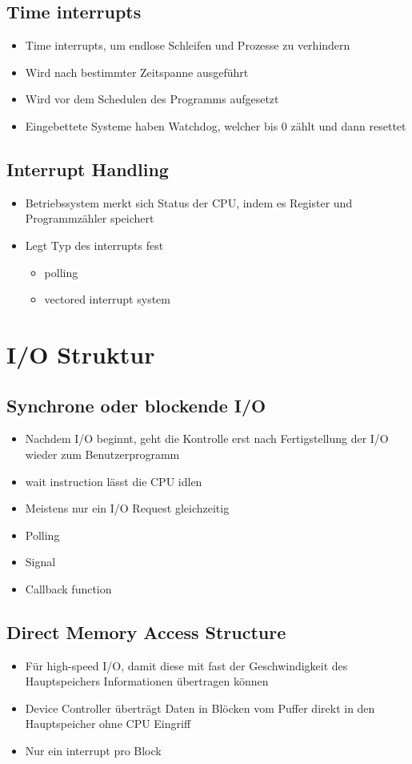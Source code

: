 \documentclass[a4paper]{scrreprt}
\begin{document}
\subsection{Time interrupts}
\begin{itemize}
	\item Time interrupts, um endlose Schleifen und Prozesse zu verhindern
	\item Wird nach bestimmter Zeitspanne ausgeführt
	\item Wird vor dem Schedulen des Programms aufgesetzt
	\item Eingebettete Systeme haben Watchdog, welcher bis 0 zählt und dann resettet
\end{itemize}

\subsection{Interrupt Handling}
\begin{itemize}
	\item Betriebssystem merkt sich Status der CPU, indem es Register und Programmzähler speichert
	\item Legt Typ des interrupts fest
		\begin{itemize}
			\item polling
			\item vectored interrupt system
		\end{itemize}
\end{itemize}

\section{I/O Struktur}
\subsection{Synchrone oder blockende I/O}
\begin{itemize}
	\item Nachdem I/O beginnt, geht die Kontrolle erst nach Fertigstellung der I/O wieder zum Benutzerprogramm
	\item wait instruction lässt die CPU idlen
	\item Meistens nur ein I/O Request gleichzeitig
	\item Polling
	\item Signal
	\item Callback function
\end{itemize}

\subsection{Direct Memory Access Structure}
\begin{itemize}
	\item Für high-speed I/O, damit diese mit fast der Geschwindigkeit des Hauptspeichers Informationen übertragen können
	\item Device Controller überträgt Daten in Blöcken vom Puffer direkt in den Hauptspeicher ohne CPU Eingriff
	\item Nur ein interrupt pro Block
\end{itemize}
\end{document}
